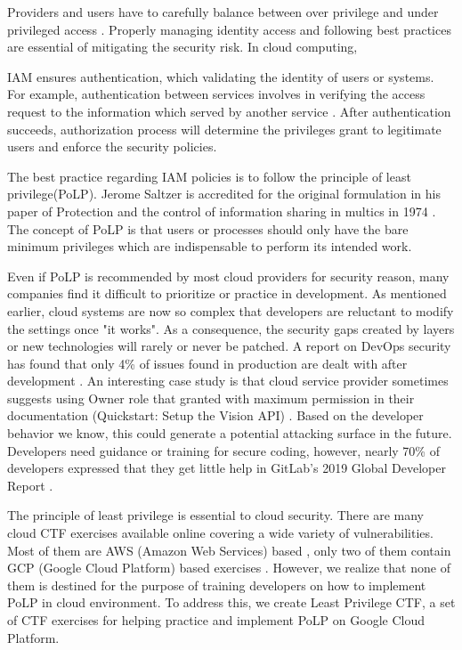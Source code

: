\documentclass[a4paper,twoside]{article}
\begin{document}
Providers and users have to carefully balance between over privilege and under privileged access \cite{Sanders2018}. Properly managing identity access and following best practices are essential of mitigating the security risk. 
In cloud computing, 

IAM ensures authentication, which validating the identity of users or systems. For example, authentication between services involves in verifying the access request to the information which served by another service \cite{AlmullaSameeraAbdulrahmanandYeun2010}.
After authentication succeeds, authorization process will determine the privileges grant to legitimate users and enforce the security policies.


The best practice regarding IAM policies is to follow the principle of least privilege(PoLP). Jerome Saltzer is accredited for the original formulation in  his paper of  Protection and the control of information sharing in multics in 1974 \cite{Saltzer1974}. The concept of PoLP is that users or processes should only have the bare minimum privileges which are indispensable to perform its intended work.

Even if PoLP is recommended by most cloud providers for security reason, many companies find it difficult to prioritize or practice in development. 
As mentioned earlier, cloud systems are now so complex that developers are reluctant to modify the settings once "it works". As a consequence, the security gaps created by layers or new technologies will rarely or never be patched. A report on DevOps security has found that only 4\% of issues found in production are dealt with after development \cite{Foremski}. 
An interesting case study is that cloud service provider sometimes suggests using Owner role that granted with maximum permission in their documentation (Quickstart: Setup the Vision API) \cite{GoogleVis}. Based on the developer behavior we know, this could generate a potential attacking surface in the future.
Developers need guidance or training for secure coding, however, nearly 70\% of developers expressed that they get little help in GitLab's 2019 Global Developer Report  \cite{Gitlab2019}.

The principle of least privilege is essential to cloud security. There are many cloud CTF exercises available online covering a wide variety of vulnerabilities. Most of them are AWS (Amazon Web Services) based \cite{flaws} \cite{flaws2} \cite{cloudgoat} \cite{serverlessgoat}, only two of them contain  GCP (Google Cloud Platform) based exercises \cite{thunder-ctf} \cite{QWIKLABS}.  However, we realize that none of them is destined for the purpose of training developers on how to implement PoLP in cloud environment. To address this, we create Least Privilege CTF, a set of CTF exercises for helping practice and implement PoLP on Google Cloud Platform.
\end{document}
